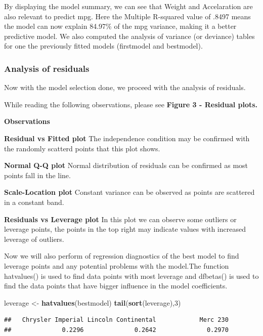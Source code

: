 \documentclass[]{article}
\newenvironment{Shaded}{\begin{snugshade}}{\end{snugshade}}
\newcommand{\KeywordTok}[1]{\textcolor[rgb]{0.13,0.29,0.53}{\textbf{{#1}}}}
\newcommand{\DecValTok}[1]{\textcolor[rgb]{0.00,0.00,0.81}{{#1}}}
\newcommand{\StringTok}[1]{\textcolor[rgb]{0.31,0.60,0.02}{{#1}}}
\newcommand{\NormalTok}[1]{{#1}}
\begin{document}
By displaying the model summary, we can see that Weight and Accelaration
are also relevant to predict mpg. Here the Multiple R-squared value of
.8497 means the model can now explain 84.97\% of the mpg variance,
making it a better predictive model. We also computed the analysis of
variance (or deviance) tables for one the previously fitted models
(firstmodel and bestmodel).

\subsubsection{Analysis of residuals}\label{analysis-of-residuals}

Now with the model selection done, we proceed with the analysis of
residuals.

While reading the following observations, please see \textbf{Figure 3 -
Residual plots.}

\textbf{Observations}

\textbf{Residual vs Fitted plot} The independence condition may be
confirmed with the randomly scatterd points that this plot shows.

\textbf{Normal Q-Q plot} Normal distribution of residuals can be
confirmed as most points fall in the line.

\textbf{Scale-Location plot} Constant variance can be observed as points
are scattered in a constant band.

\textbf{Residuals vs Leverage plot} In this plot we can observe some
outliers or leverage points, the points in the top right may indicate
values with increased leverage of outliers.

Now we will also perform of regression diagnostics of the best model to
find leverage points and any potential problems with the model.The
function hatvalues() is used to find data points with most leverage and
dfbetas() is used to find the data points that have bigger influence in
the model coefficients.

\begin{Shaded}
\begin{Highlighting}[]
\NormalTok{leverage <-}\StringTok{ }\KeywordTok{hatvalues}\NormalTok{(bestmodel)}
\KeywordTok{tail}\NormalTok{(}\KeywordTok{sort}\NormalTok{(leverage),}\DecValTok{3}\NormalTok{)}
\end{Highlighting}
\end{Shaded}

\begin{verbatim}
##   Chrysler Imperial Lincoln Continental            Merc 230 
##              0.2296              0.2642              0.2970
\end{verbatim}
\end{document}
